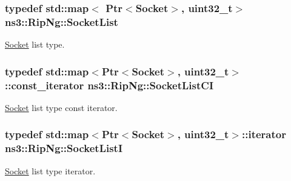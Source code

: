 \subsubsection[{\texorpdfstring{Socket\+List}{SocketList}}]{\setlength{\rightskip}{0pt plus 5cm}typedef std\+::map$<$ {\bf Ptr}$<${\bf Socket}$>$, uint32\+\_\+t$>$ {\bf ns3\+::\+Rip\+Ng\+::\+Socket\+List}\hspace{0.3cm}{\ttfamily [private]}}\hypertarget{classns3_1_1RipNg_a30c4bb1a1f2d08a0387268645d15d328}{}\label{classns3_1_1RipNg_a30c4bb1a1f2d08a0387268645d15d328}


\hyperlink{classns3_1_1Socket}{Socket} list type. 

\subsubsection[{\texorpdfstring{Socket\+List\+CI}{SocketListCI}}]{\setlength{\rightskip}{0pt plus 5cm}typedef std\+::map$<${\bf Ptr}$<${\bf Socket}$>$, uint32\+\_\+t$>$\+::const\+\_\+iterator {\bf ns3\+::\+Rip\+Ng\+::\+Socket\+List\+CI}\hspace{0.3cm}{\ttfamily [private]}}\hypertarget{classns3_1_1RipNg_a7b361620ae7f6a01aadf958b9822f3fb}{}\label{classns3_1_1RipNg_a7b361620ae7f6a01aadf958b9822f3fb}


\hyperlink{classns3_1_1Socket}{Socket} list type const iterator. 

\subsubsection[{\texorpdfstring{Socket\+ListI}{SocketListI}}]{\setlength{\rightskip}{0pt plus 5cm}typedef std\+::map$<${\bf Ptr}$<${\bf Socket}$>$, uint32\+\_\+t$>$\+::iterator {\bf ns3\+::\+Rip\+Ng\+::\+Socket\+ListI}\hspace{0.3cm}{\ttfamily [private]}}\hypertarget{classns3_1_1RipNg_a549052bbb55168d029f82d78384144b4}{}\label{classns3_1_1RipNg_a549052bbb55168d029f82d78384144b4}


\hyperlink{classns3_1_1Socket}{Socket} list type iterator. 



